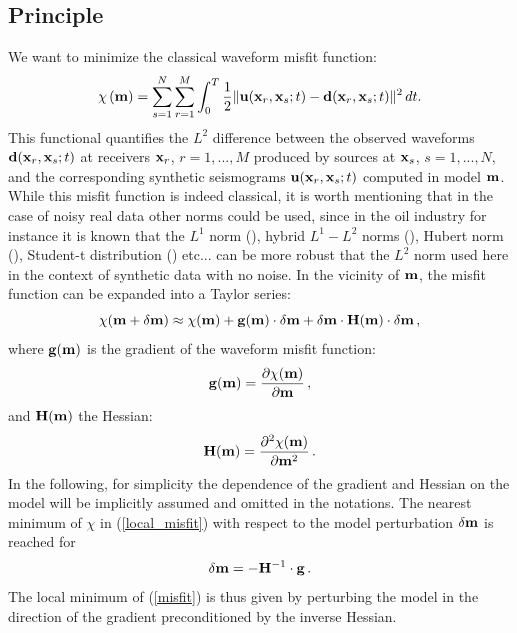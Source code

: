 \subsection{Principle}

We want to minimize the classical waveform misfit function:
\begin{equation}
\chi \left( \mathbf{m} \right) = \sum_{s=1}^N\sum_{r=1}^M \int_0^T \frac{1}{2} \|\mathbf{u}(\mathbf{x}_r, \mathbf{x}_s; t) - \mathbf{d}(\mathbf{x}_r, \mathbf{x}_s; t)\| ^{2} \, dt .
\label{misfit}
\end{equation}
This functional quantifies the $L^2$ difference between the observed waveforms $\mathbf{d}(\mathbf{x}_r, \mathbf{x}_s; t)$ at receivers $\mathbf{x}_r$, $r = 1, ..., M$
produced by sources at $\mathbf{x}_s$, $s=1,...,N$, and the corresponding synthetic seismograms $\mathbf{u}(\mathbf{x}_r, \mathbf{x}_s; t)$ computed in model $\mathbf{m}$.
While this misfit function is indeed classical, it is worth mentioning that in the case of noisy real data other norms could be used,
since in the oil industry for instance it is known that the $L^1$ norm
(\cite{CrPiNoMcTa90,BrOpVi2010}), hybrid $L^1-L^2$ norms (\cite{Bube_1997_HL1}), Hubert norm (\cite{Ha_2009_WIU}),
Student-t distribution (\cite{ArVaHe11,Jeong_2015}) etc... can be more robust that the $L^2$ norm used here in the context of synthetic data with no noise.
In the vicinity of $\mathbf{m}$, the misfit function can be expanded into a Taylor series:
\begin{equation}
\chi(\mathbf{m}+ \delta\mathbf{m}) \approx \chi(\mathbf{m})+\mathbf{g}(\mathbf{m})\cdot\delta\mathbf{m}
+\delta\mathbf{m}\cdot\mathbf{H}(\mathbf{m})\cdot\delta\mathbf{m} \, ,
\label{local_misfit}
\end{equation}
where $\mathbf{g}(\mathbf{m})$ is the gradient of the waveform misfit function:
\begin{equation}
\mathbf{g}(\mathbf{m}) = \frac{\partial\chi(\mathbf{m})}{\partial\mathbf{m}} \, ,
\end{equation}
and $\mathbf{H}(\mathbf{m})$ the Hessian:
\begin{equation}
\mathbf{H}(\mathbf{m}) = \frac{\partial^2\chi(\mathbf{m})}{\partial\mathbf{m}^2} \, .
\end{equation}
In the following, for simplicity the dependence of the gradient and Hessian on the model will be implicitly assumed and omitted in the notations.
The nearest minimum of $\chi$ in (\ref{local_misfit}) with respect to the model perturbation $\delta \mathbf{m}$ is reached for
\begin{equation}
\delta \mathbf{m} = -\mathbf{H}^{-1} \cdot \mathbf{g} \, .
\label{Newton}
\end{equation}
The local minimum of (\ref{misfit}) is thus given by perturbing the model in the direction of the gradient preconditioned
by the inverse Hessian.

